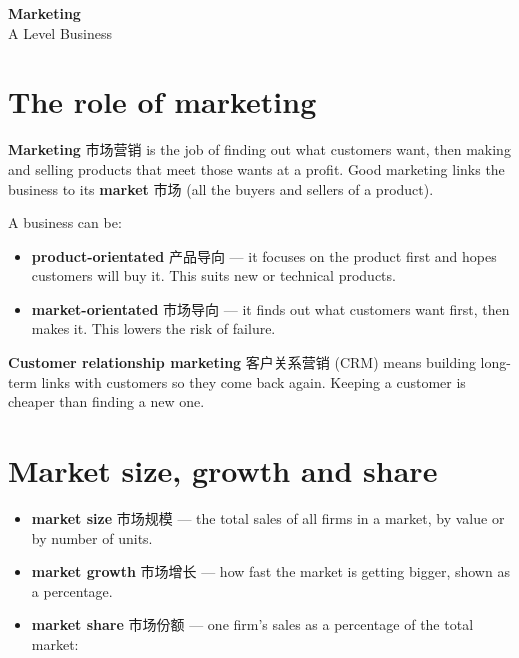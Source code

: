 \documentclass[11pt]{article}
\begin{document}
\begin{center}
  {\LARGE\bfseries Marketing}\\[0.35em]
  {\large A Level Business}
\end{center}
\vspace{0.6em}

\section*{The role of marketing}

\textbf{Marketing} 市场营销 is the job of finding out what customers want, then making and selling products that meet those wants at a profit. Good marketing links the business to its \textbf{market} 市场 (all the buyers and sellers of a product).

A business can be:

\begin{itemize}
\item \textbf{product-orientated} 产品导向 — it focuses on the product first and hopes customers will buy it. This suits new or technical products.

\item \textbf{market-orientated} 市场导向 — it finds out what customers want first, then makes it. This lowers the risk of failure.

\end{itemize}

\textbf{Customer relationship marketing} 客户关系营销 (CRM) means building long-term links with customers so they come back again. Keeping a customer is cheaper than finding a new one.

\section*{Market size, growth and share}

\begin{itemize}
\item \textbf{market size} 市场规模 — the total sales of all firms in a market, by value or by number of units.

\item \textbf{market growth} 市场增长 — how fast the market is getting bigger, shown as a percentage.

\item \textbf{market share} 市场份额 — one firm's sales as a percentage of the total market:

\end{itemize}
\end{document}
